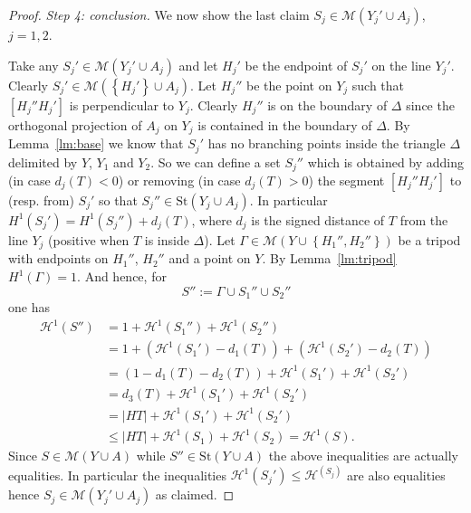 \documentclass{amsart}
\renewcommand{\H}{\mathcal H}
\newcommand{\abs}[1]{\left\vert #1 \right\vert}
\newcommand{\ENCLOSE}[1]{\left\{#1\right\}}
\newcommand{\St}{\mathrm{St}}
\newcommand{\M}{\mathcal{M}}
\renewcommand{\H}{\mathcal{H}}
\theoremstyle{definition}
\theoremstyle{remark}
\begin{document}
\begin{proof}
  \emph{Step 4: conclusion.}
  We now show the last claim $S_j \in \M(Y_j'\cup A_j)$, $j=1,2$.

  Take any $S_j'\in \M(Y_j'\cup A_j)$ and let $H_j'$ be the 
  endpoint of $S_j'$ on the line $Y_j'$. 
  Clearly $S_j'\in \M(\ENCLOSE{H_j'}\cup A_j)$.
  Let $H_j''$ be the point on $Y_j$ such that $[H_j'' H_j']$ is perpendicular
  to $Y_j$. 
  Clearly $H_j''$ is on the boundary of $\Delta$ since the orthogonal 
  projection of $A_j$ on $Y_j$ is contained in the boundary of $\Delta$.
  By Lemma~\ref{lm:base} we know that $S_j'$ has no branching points
  inside the triangle $\Delta$ delimited by $Y$, $Y_1$ and $Y_2$.
  So we can define a set $S_j''$ which is obtained by adding
  (in case $d_j(T)<0$)
  or removing (in case $d_j(T)>0$)
  the segment $[H_j'' H_j']$ to (resp. from) $S_j'$ 
  so that $S_j''\in \St(Y_j\cup A_j)$.
  In particular $H^1(S_j') = H^1(S_j'') + d_j(T)$,
  where $d_j$ is the signed distance of $T$ from the line $Y_j$ (positive 
  when $T$ is inside $\Delta$).
  Let $\Gamma\in \M(Y\cup\ENCLOSE{H_1'',H_2''})$ 
  be a tripod with endpoints on $H_1''$, $H_2''$ and a 
  point on $Y$. 
  By Lemma~\ref{lm:tripod} $H^1(\Gamma) = 1$.
  And hence, for 
  \[
   S'' := \Gamma \cup S_1'' \cup S_2''  
  \]
  one has 
  \begin{align*}
    \H^1(S'')
    &= 1 + \H^1(S_1'') + \H^1(S_2'') \\
    &= 1 + (\H^1(S_1') - d_1(T)) + (\H^1(S_2') - d_2(T)) \\
    &= (1-d_1(T) - d_2(T)) + \H^1(S_1') + \H^1(S_2') \\
    &= d_3(T) + \H^1(S_1') + \H^1(S_2') \\
    &= \abs{HT} + \H^1(S_1') + \H^1(S_2') \\
    &\le \abs{HT} + \H^1(S_1) + \H^1(S_2)
    = \H^1(S).
  \end{align*}
  Since $S\in \M(Y\cup A)$ while $S''\in \St(Y\cup A)$ the above 
  inequalities are actually equalities.
  In particular the inequalities $\H^1(S_j') \le \H^(S_j)$ are 
  also equalities hence $S_j\in \M(Y_j'\cup A_j)$ as claimed.
\end{proof}
\end{document}
